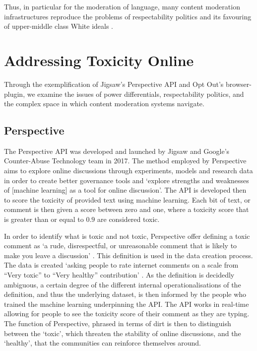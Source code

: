 Thus, in particular for the moderation of language, many content moderation infrastructures reproduce the problems of respectability politics and its favouring of upper-middle class White ideals \cite{Kerrison:2017}.

\section{Addressing Toxicity Online}

Through the exemplification of Jigsaw's Perspective API and Opt Out's browser-plugin, we examine the issues of power differentials, respectability politics, and the complex space in which content moderation systems navigate.

\subsection{Perspective}

The Perspective API was developed \cite{Wulczyn:2017} and launched by Jigsaw and Google's Counter-Abuse Technology team in 2017. The method employed by Perspective aims to explore online discussions through experiments, models and research data in order to create better governance tools and `explore strengths and weaknesses of [machine learning] as a tool for online discussion'. The API is developed then to score the toxicity of provided text using machine learning. Each bit of text, or comment is then given a score between zero and one, where a toxicity score that is greater than or equal to $0.9$ are considered toxic.

In order to identify what is toxic and not toxic, Perspective offer defining a toxic comment as ‘a rude, disrespectful, or unreasonable comment that is likely to make you leave a discussion' \cite{PerspectiveAPI}. This definition is used in the data creation process. The data is created `asking people to rate internet comments on a scale from “Very toxic” to “Very healthy” contribution' \cite{Gomes:2018}. As the definition is decidedly ambiguous, a certain degree of the different internal operationalisations of the definition, and thus the underlying dataset, is then informed by the people who trained the machine learning underpinning the API. The API works in real-time allowing for people to see the toxicity score of their comment as they are typing. The function of Perspective, phrased in terms of dirt is then to distinguish between the `toxic', which threaten the stability of online discussions, and the `healthy', that the communities can reinforce themselves around.\vspace{5mm}

